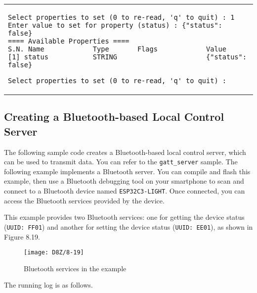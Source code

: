 \documentclass[a4paper,12pt]{book}
\begin{document}
\begin{enumerate}[label=\arabic*.,leftmargin=1.5em]
    \begin{codebloc}
    \begin{tabular}{a}
    \vspace{2pt}
\begin{verbatim}
Select properties to set (0 to re-read, 'q' to quit) : 1
Enter value to set for property (status) : {"status": false}
==== Available Properties ====
S.N. Name            Type       Flags            Value           
[1] status           STRING                      {"status": false}  
\end{verbatim}
\verb|Select properties to set (0 to re-read, 'q' to quit) :  |
    \end{tabular}
    \end{codebloc}
\end{enumerate}

\subsection{Creating a Bluetooth-based Local Control Server}
The following sample code creates a Bluetooth-based local control server, which can be used to transmit data. You can refer to the \verb|gatt_server| sample. The following example implements a Bluetooth server. You can compile and flash this example, then use a Bluetooth debugging tool on your smartphone to scan and connect to a Bluetooth device named \verb|ESP32C3-LIGHT|. Once connected, you can access the Bluetooth services provided by the device.


This example provides two Bluetooth services: one for getting the device status (\verb|UUID: FF01|) and another for setting the device status (\verb|UUID: EE01|), as shown in Figure 8.19.

\begin{figure}[!h]
    \centering
    \texttt{[image: D8Z/8-19]}
    \caption{Bluetooth services in the example}
\end{figure}

The running log is as follows.
\end{document}
